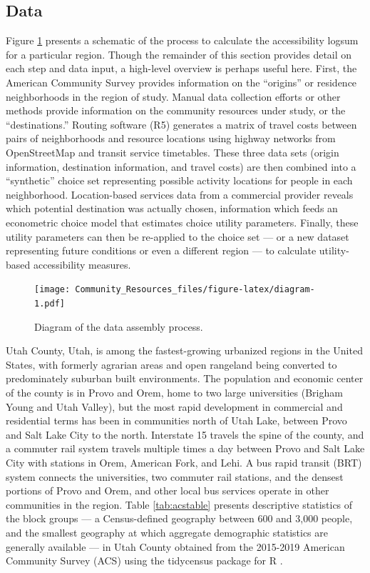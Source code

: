 \documentclass[ijerph,article,submit,moreauthors,pdftex]{mdpi}
\begin{document}
\hypertarget{data}{%
\subsection{Data}\label{data}}

Figure \ref{fig:diagram} presents a schematic of the process to calculate the accessibility logsum for a particular region. Though the remainder of this section provides detail on each step and data input, a high-level overview is perhaps useful here. First, the American Community Survey provides information on the ``origins'' or residence neighborhoods in the region of study. Manual data collection efforts or other methods provide information on the community resources under study, or the ``destinations.'' Routing software (R5) generates a matrix of travel costs between pairs of neighborhoods and resource locations using highway networks from OpenStreetMap and transit service timetables. These three data sets (origin information, destination information, and travel costs) are then combined into a ``synthetic'' choice set representing possible activity locations for people in each neighborhood. Location-based services data from a commercial provider reveals which potential destination was actually chosen, information which feeds an econometric choice model that estimates choice utility parameters. Finally, these utility parameters can then be re-applied to the choice set --- or a new dataset representing future conditions or even a different region --- to calculate utility-based accessibility measures.

\begin{figure}
\centering
\texttt{[image: Community\_Resources\_files/figure-latex/diagram-1.pdf]}
\caption{\label{fig:diagram}Diagram of the data assembly process.}
\end{figure}

Utah County, Utah, is among the fastest-growing urbanized regions in the United
States, with formerly agrarian areas and open rangeland being converted to
predominately suburban built environments. The population and economic center of
the county is in Provo and Orem, home to two large universities (Brigham Young
and Utah Valley), but the most rapid development in commercial and residential
terms has been in communities north of Utah Lake, between Provo and Salt Lake
City to the north. Interstate 15 travels the spine of the county, and a commuter
rail system travels multiple times a day between Provo and Salt Lake City with
stations in Orem, American Fork, and Lehi. A bus rapid transit (BRT) system connects
the universities, two commuter rail stations, and the densest portions of Provo
and Orem, and other local bus services operate in other communities in the region.
Table \ref{tab:acstable} presents descriptive statistics of
the block groups --- a Census-defined geography between 600 and 3,000 people, and the smallest geography at which aggregate demographic statistics are generally available --- in Utah County obtained from the 2015-2019 American Community
Survey (ACS) using the tidycensus package for R \citep{tidycensus}.
\end{document}
